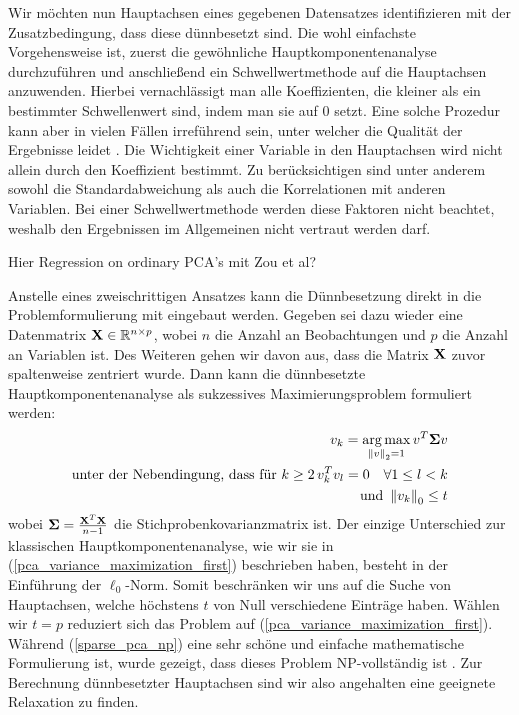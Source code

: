 Wir möchten nun Hauptachsen eines gegebenen Datensatzes identifizieren mit der Zusatzbedingung, dass diese dünnbesetzt sind. Die wohl einfachste Vorgehensweise ist, zuerst die gewöhnliche Hauptkomponentenanalyse durchzuführen und anschließend ein Schwellwertmethode auf die Hauptachsen anzuwenden. Hierbei vernachlässigt man alle Koeffizienten, die kleiner als ein bestimmter Schwellenwert sind, indem man sie auf 0 setzt. Eine solche Prozedur kann aber in vielen Fällen irreführend sein, unter welcher die Qualität der Ergebnisse leidet \cite{cadima}. Die Wichtigkeit einer Variable in den Hauptachsen wird nicht allein durch den Koeffizient bestimmt. Zu berücksichtigen sind unter anderem sowohl die Standardabweichung als auch die Korrelationen mit anderen Variablen. Bei einer Schwellwertmethode werden diese Faktoren nicht beachtet, weshalb den Ergebnissen im Allgemeinen nicht vertraut werden darf.

Hier Regression on ordinary PCA's mit Zou et al?

Anstelle eines zweischrittigen Ansatzes kann die Dünnbesetzung direkt in die Problemformulierung mit eingebaut werden. Gegeben sei dazu wieder eine Datenmatrix $\mathbf{X} \in \mathbb{R}^{n \times p}$, wobei $n$ die Anzahl an Beobachtungen und $p$ die Anzahl an Variablen ist. Des Weiteren gehen wir davon aus, dass die Matrix $\mathbf{X}$ zuvor spaltenweise zentriert wurde. Dann kann die dünnbesetzte Hauptkomponentenanalyse als sukzessives Maximierungsproblem formuliert werden:
\begin{gather}
\label{sparse_pca_np}
\begin{split}
v_{k} = \operatorname*{arg\,max}_{\left\lVert v \right\rVert_2 = 1} v^{T}\mathbf{\Sigma} v\\
\text{unter der Nebendingung, dass für } k\geq 2 \, v_{k}^Tv_{l} = 0 \quad \forall 1 \leq l < k\\
\text{und } \left\lVert v_{k} \right\rVert_0 \leq t 
\end{split}
\end{gather}
wobei $\mathbf{\Sigma} = \frac{\mathbf{X}^T \mathbf{X}}{n-1}$ die Stichprobenkovarianzmatrix ist. Der einzige Unterschied zur klassischen Hauptkomponentenanalyse, wie wir sie in (\ref{pca_variance_maximization_first}) beschrieben haben, besteht in der Einführung der $\ell_0$-Norm. Somit beschränken wir uns auf die Suche von Hauptachsen, welche höchstens $t$ von Null verschiedene Einträge haben. Wählen wir $t = p$ reduziert sich das Problem auf (\ref{pca_variance_maximization_first}). Während (\ref{sparse_pca_np}) eine sehr schöne und einfache mathematische Formulierung ist, wurde gezeigt, dass dieses Problem NP-vollständig ist \cite{foucart}. Zur Berechnung dünnbesetzter Hauptachsen sind wir also angehalten eine geeignete Relaxation zu finden.


